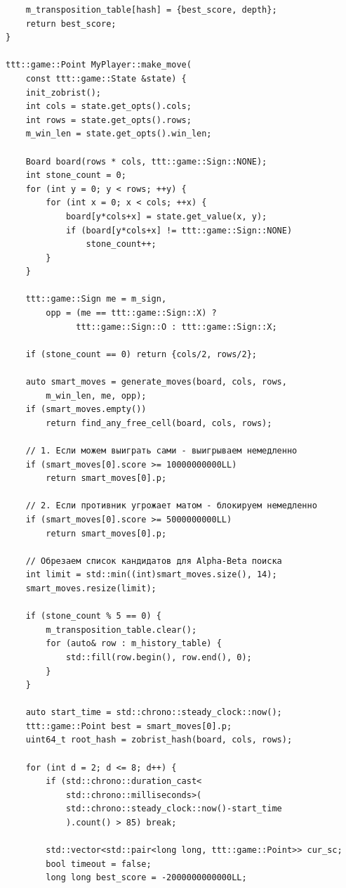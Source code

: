 \documentclass[a4paper,14pt]{extreport}
\begin{document}
\begin{lstlisting}
    m_transposition_table[hash] = {best_score, depth};
    return best_score;
}

ttt::game::Point MyPlayer::make_move(
    const ttt::game::State &state) {
    init_zobrist();
    int cols = state.get_opts().cols;
    int rows = state.get_opts().rows;
    m_win_len = state.get_opts().win_len; 
    
    Board board(rows * cols, ttt::game::Sign::NONE);
    int stone_count = 0;
    for (int y = 0; y < rows; ++y) {
        for (int x = 0; x < cols; ++x) {
            board[y*cols+x] = state.get_value(x, y);
            if (board[y*cols+x] != ttt::game::Sign::NONE) 
                stone_count++;
        }
    }
    
    ttt::game::Sign me = m_sign, 
        opp = (me == ttt::game::Sign::X) ? 
              ttt::game::Sign::O : ttt::game::Sign::X;
    
    if (stone_count == 0) return {cols/2, rows/2}; 
    
    auto smart_moves = generate_moves(board, cols, rows, 
        m_win_len, me, opp);
    if (smart_moves.empty()) 
        return find_any_free_cell(board, cols, rows);
    
    // 1. Если можем выиграть сами - выигрываем немедленно
    if (smart_moves[0].score >= 10000000000LL) 
        return smart_moves[0].p;
    
    // 2. Если противник угрожает матом - блокируем немедленно
    if (smart_moves[0].score >= 5000000000LL) 
        return smart_moves[0].p;
    
    // Обрезаем список кандидатов для Alpha-Beta поиска
    int limit = std::min((int)smart_moves.size(), 14);
    smart_moves.resize(limit);
    
    if (stone_count % 5 == 0) {
        m_transposition_table.clear();
        for (auto& row : m_history_table) {
            std::fill(row.begin(), row.end(), 0);
        }
    }
    
    auto start_time = std::chrono::steady_clock::now();
    ttt::game::Point best = smart_moves[0].p;
    uint64_t root_hash = zobrist_hash(board, cols, rows);
    
    for (int d = 2; d <= 8; d++) {
        if (std::chrono::duration_cast<
            std::chrono::milliseconds>(
            std::chrono::steady_clock::now()-start_time
            ).count() > 85) break;
        
        std::vector<std::pair<long long, ttt::game::Point>> cur_sc;
        bool timeout = false; 
        long long best_score = -2000000000000LL;
        

\end{lstlisting}
\end{document}
